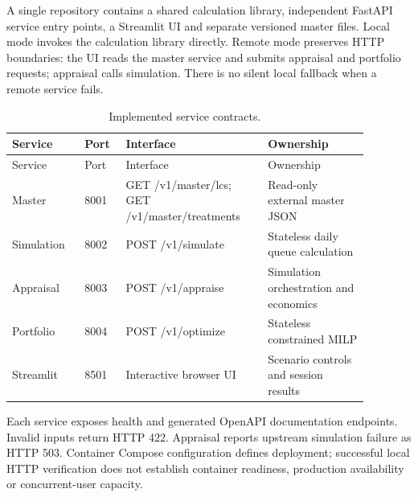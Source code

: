 \documentclass[11pt,a4paper]{article}
\begin{document}
A single repository contains a shared calculation library, independent FastAPI service entry points, a Streamlit UI and separate versioned master files. Local mode invokes the calculation library directly. Remote mode preserves HTTP boundaries: the UI reads the master service and submits appraisal and portfolio requests; appraisal calls simulation. There is no silent local fallback when a remote service fails.

\begin{longtable}{p{0.18\linewidth}p{0.10\linewidth}p{0.35\linewidth}p{0.25\linewidth}}
\caption{Implemented service contracts.}\\\toprule
Service & Port & Interface & Ownership\\\midrule\endfirsthead
\toprule Service & Port & Interface & Ownership\\\midrule\endhead
Master & 8001 & GET /v1/master/lcs; GET /v1/master/treatments & Read-only external master JSON\\
Simulation & 8002 & POST /v1/simulate & Stateless daily queue calculation\\
Appraisal & 8003 & POST /v1/appraise & Simulation orchestration and economics\\
Portfolio & 8004 & POST /v1/optimize & Stateless constrained MILP\\
Streamlit & 8501 & Interactive browser UI & Scenario controls and session results\\\bottomrule
\end{longtable}
Each service exposes health and generated OpenAPI documentation endpoints. Invalid inputs return HTTP 422. Appraisal reports upstream simulation failure as HTTP 503. Container Compose configuration defines deployment; successful local HTTP verification does not establish container readiness, production availability or concurrent-user capacity.
\end{document}
